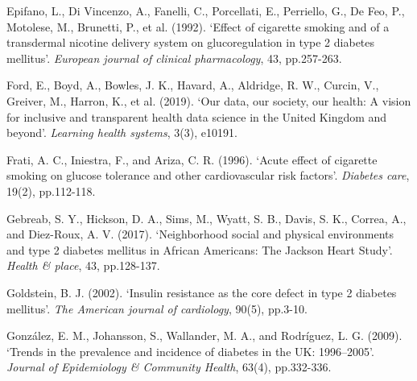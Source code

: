 \begin{Reference}
\begin{flushleft}
Epifano, L., Di Vincenzo, A., Fanelli, C., Porcellati, E., Perriello, G., De Feo, P., Motolese, M., Brunetti, P., et al. (1992). `Effect of cigarette smoking and of a transdermal nicotine delivery system on glucoregulation in type 2 diabetes mellitus'. \textit{European journal of clinical pharmacology}, 43, pp.257-263.
\end{flushleft}
\vspace{2pt}


\begin{flushleft}
Ford, E., Boyd, A., Bowles, J. K., Havard, A., Aldridge, R. W., Curcin, V., Greiver, M., Harron, K., et al. (2019). `Our data, our society, our health: A vision for inclusive and transparent health data science in the United Kingdom and beyond'. \textit{Learning health systems}, 3(3), e10191.
\end{flushleft}
\vspace{7pt}


\begin{flushleft}
Frati, A. C., Iniestra, F., and Ariza, C. R. (1996). `Acute effect of cigarette smoking on glucose tolerance and other cardiovascular risk factors'. \textit{Diabetes care}, 19(2), pp.112-118.
\end{flushleft}
\vspace{2pt}


\begin{flushleft}
Gebreab, S. Y., Hickson, D. A., Sims, M., Wyatt, S. B., Davis, S. K., Correa, A., and Diez-Roux, A. V. (2017). `Neighborhood social and physical environments and type 2 diabetes mellitus in African Americans: The Jackson Heart Study'. \textit{Health \& place}, 43, pp.128-137.
\end{flushleft}
\vspace{2pt}


\begin{flushleft}
Goldstein, B. J. (2002). `Insulin resistance as the core defect in type 2 diabetes mellitus'. \textit{The American journal of cardiology}, 90(5), pp.3-10.
\end{flushleft}
\vspace{2pt}


\begin{flushleft}
González, E. M., Johansson, S., Wallander, M. A., and Rodríguez, L. G. (2009). `Trends in the prevalence and incidence of diabetes in the UK: 1996–2005'. \textit{Journal of Epidemiology \& Community Health}, 63(4), pp.332-336.
\end{flushleft}
\vspace{2pt}



\end{Reference}
